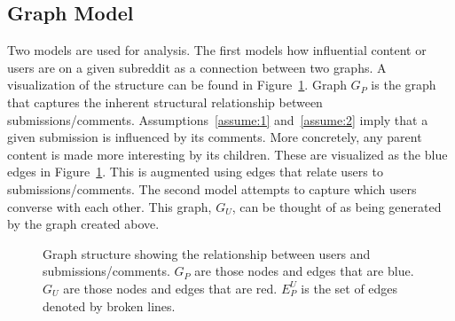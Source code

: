\documentclass[letterpaper, 10 pt, conference]{ieeeconf}
\theoremstyle{definition}
\begin{document}
\subsection{Graph Model}
Two models are used for analysis. The first models how influential content or users are on a given subreddit as a connection between two graphs. A visualization of the structure can be found in Figure~\ref{fig:model:hypergraph}. Graph \(G_P\) is the graph that captures the inherent structural relationship between submissions/comments. Assumptions~\ref{assume:1} and~\ref{assume:2} imply that a given submission is influenced by its comments. More concretely, any parent content is made more interesting by its children. These are visualized as the blue edges in Figure~\ref{fig:model:hypergraph}. This is augmented using edges that relate users to submissions/comments. The second model attempts to capture which users converse with each other. This graph, \(G_U\), can be thought of as being generated by the graph created above.

\begin{figure}
  \centering
  \caption{Graph structure showing the relationship between users and submissions/comments. \(G_P\) are those nodes and edges that are blue. \(G_U\) are those nodes and edges that are red. \(E_P^U\) is the set of edges denoted by broken lines.}
  \label{fig:model:hypergraph}
\end{figure}
\end{document}
